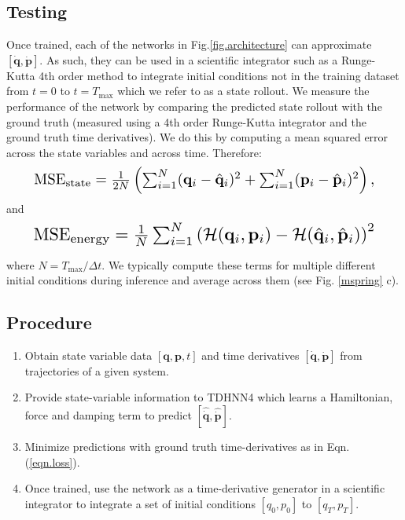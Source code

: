 \documentclass{article}
\begin{document}
\subsection{Testing}
Once trained, each of the networks in Fig.\ref{fig.architecture} can approximate $[\dot{\mathbf{q}},\dot{\mathbf{p}}]$. As such, they can be used in a scientific integrator such as a Runge-Kutta 4th order method to integrate initial conditions not in the training dataset from $t=0$ to $t=T_{\max}$ which we refer to as a state rollout. We measure the performance of the network by comparing the predicted state rollout with the ground truth (measured using a 4th order Runge-Kutta integrator and the ground truth time derivatives). We do this by computing a mean squared error across the state variables and across time. Therefore:
\begin{equation}
\resizebox{0.9\linewidth}{!}{$%
\mathrm{MSE}_{\mathrm{state}} = \frac{1}{2N} \left(\sum_{i=1}^N (\mathbf{q}_i-\hat{\mathbf{q}}_i)^2 + \sum_{i=1}^N (\mathbf{p}_i - \hat{\mathbf{p}}_i)^2\right),$}%
\end{equation}
and
\begin{equation}
\resizebox{0.9\linewidth}{!}{$%
\mathrm{MSE}_{\mathrm{energy}} = \frac{1}{N} \sum_{i=1}^N \left(\mathcal{H}(\mathbf{q}_i,\mathbf{p}_i)-\mathcal{H}(\hat{\mathbf{q}}_i,\hat{\mathbf{p}}_i)\right)^2$}%
\end{equation}

where $N = T_{\max}/\Delta t $. We typically compute these terms for multiple different initial conditions during inference and average across them (see Fig. \ref{mspring} c).



\subsection{Procedure}

\begin{enumerate}
\item Obtain state variable data $[\mathbf{q},\mathbf{p},t]$ and time derivatives $[\dot{\mathbf{q}},\dot{\mathbf{p}}]$ from trajectories of a given system.
\item Provide state-variable information to TDHNN4 which learns a Hamiltonian, force and damping term to predict $[\hat{\dot{\mathbf{q}}},\hat{\dot{\mathbf{p}}}]$.
\item Minimize predictions with ground truth time-derivatives as in Eqn.(\ref{eqn.loss}).
\item Once trained, use the network as a time-derivative generator in a scientific integrator to integrate a set of initial conditions $[q_0,p_0]$ to $[q_T,p_T]$.
\end{enumerate}
\end{document}
